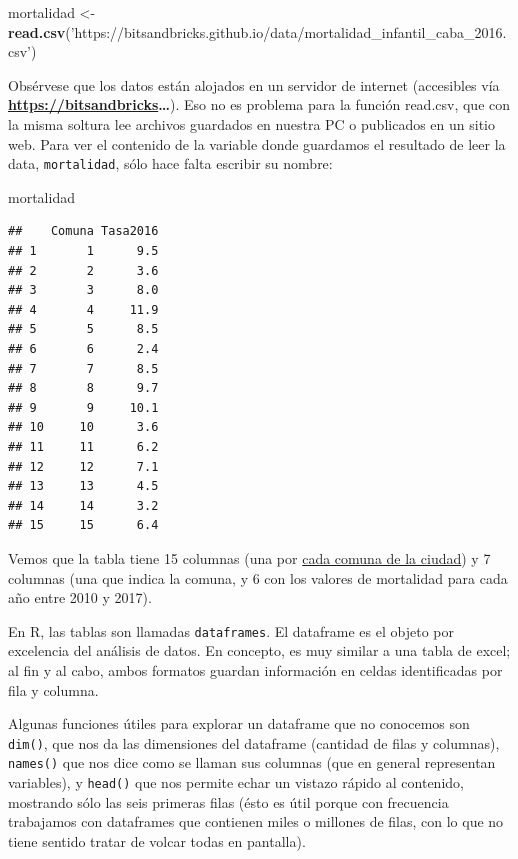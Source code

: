 \documentclass[]{book}
\newenvironment{Shaded}{\begin{snugshade}}{\end{snugshade}}
\newcommand{\KeywordTok}[1]{\textcolor[rgb]{0.13,0.29,0.53}{\textbf{#1}}}
\newcommand{\StringTok}[1]{\textcolor[rgb]{0.31,0.60,0.02}{#1}}
\newcommand{\NormalTok}[1]{#1}
\begin{document}
\begin{Shaded}
\begin{Highlighting}[]
\NormalTok{mortalidad <-}\StringTok{ }\KeywordTok{read.csv}\NormalTok{(}\StringTok{'https://bitsandbricks.github.io/data/mortalidad_infantil_caba_2016.csv'}\NormalTok{)}
\end{Highlighting}
\end{Shaded}

Obsérvese que los datos están alojados en un servidor de internet
(accesibles vía \textbf{\url{https://bitsandbricks}\ldots{}}). Eso no es
problema para la función read.csv, que con la misma soltura lee archivos
guardados en nuestra PC o publicados en un sitio web. Para ver el
contenido de la variable donde guardamos el resultado de leer la data,
\texttt{mortalidad}, sólo hace falta escribir su nombre:

\begin{Shaded}
\begin{Highlighting}[]
\NormalTok{mortalidad}
\end{Highlighting}
\end{Shaded}

\begin{verbatim}
##    Comuna Tasa2016
## 1       1      9.5
## 2       2      3.6
## 3       3      8.0
## 4       4     11.9
## 5       5      8.5
## 6       6      2.4
## 7       7      8.5
## 8       8      9.7
## 9       9     10.1
## 10     10      3.6
## 11     11      6.2
## 12     12      7.1
## 13     13      4.5
## 14     14      3.2
## 15     15      6.4
\end{verbatim}

Vemos que la tabla tiene 15 columnas (una por
\href{https://es.wikipedia.org/wiki/Comunas_de_la_ciudad_de_Buenos_Aires}{cada
comuna de la ciudad}) y 7 columnas (una que indica la comuna, y 6 con
los valores de mortalidad para cada año entre 2010 y 2017).

En R, las tablas son llamadas \texttt{dataframes}. El dataframe es el
objeto por excelencia del análisis de datos. En concepto, es muy similar
a una tabla de excel; al fin y al cabo, ambos formatos guardan
información en celdas identificadas por fila y columna.

Algunas funciones útiles para explorar un dataframe que no conocemos son
\texttt{dim()}, que nos da las dimensiones del dataframe (cantidad de
filas y columnas), \texttt{names()} que nos dice como se llaman sus
columnas (que en general representan variables), y \texttt{head()} que
nos permite echar un vistazo rápido al contenido, mostrando sólo las
seis primeras filas (ésto es útil porque con frecuencia trabajamos con
dataframes que contienen miles o millones de filas, con lo que no tiene
sentido tratar de volcar todas en pantalla).
\end{document}
